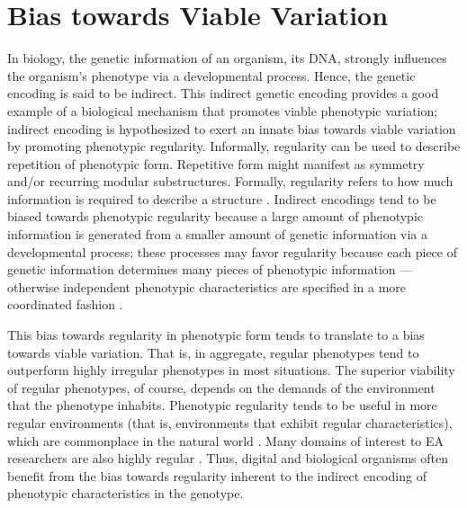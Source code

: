 \section{Bias towards Viable Variation} \label{sec:useful_variation}

In biology, the genetic information of an organism, its DNA, strongly influences the organism's phenotype via a developmental process. Hence, the genetic encoding is said to be indirect. This indirect genetic encoding provides a good example of a biological mechanism that promotes viable phenotypic variation; indirect encoding is hypothesized to exert an innate bias towards viable variation by promoting phenotypic regularity. Informally, regularity can be used to describe repetition of phenotypic form. Repetitive form might manifest as symmetry and/or recurring modular substructures. Formally, regularity refers to how much information is required to describe a structure \cite{Clune2011OnRegularity}. Indirect encodings tend to be biased towards phenotypic regularity because a large amount of phenotypic information is generated from a smaller amount of genetic information via a developmental process; these processes may favor regularity because each piece of genetic information determines many pieces of phenotypic information --- otherwise independent phenotypic characteristics are specified in a more coordinated fashion \cite{Clune2011OnRegularity}. 

This bias towards regularity in phenotypic form tends to translate to a bias towards viable variation. That is, in aggregate, regular phenotypes tend to outperform highly irregular phenotypes in most situations. The superior viability of regular phenotypes, of course, depends on the demands of the environment that the phenotype inhabits. Phenotypic regularity tends to be useful in more regular environments (that is, environments that exhibit regular characteristics), which are commonplace in the natural world \cite[pg 161]{Downing2015IntelligenceSystems}. Many domains of interest to EA researchers are also highly regular \cite{Clune2011OnRegularity}. Thus, digital and biological organisms often benefit from the bias towards regularity inherent to the indirect encoding of phenotypic characteristics in the genotype.

